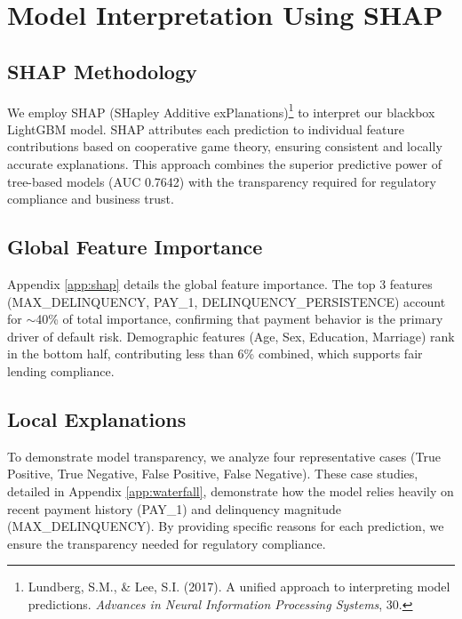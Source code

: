 \documentclass[12pt]{article}
\begin{document}
\section{Model Interpretation Using SHAP}\label{sec:shap}

\subsection{SHAP Methodology}

We employ SHAP (SHapley Additive exPlanations)\footnote{Lundberg, S.M., \& Lee, S.I. (2017). A unified approach to interpreting model predictions. \textit{Advances in Neural Information Processing Systems}, 30.} to interpret our blackbox LightGBM model. SHAP attributes each prediction to individual feature contributions based on cooperative game theory, ensuring consistent and locally accurate explanations. This approach combines the superior predictive power of tree-based models (AUC 0.7642) with the transparency required for regulatory compliance and business trust.

\subsection{Global Feature Importance}

Appendix \ref{app:shap} details the global feature importance. The top 3 features (MAX\_DELINQUENCY, PAY\_1, DELINQUENCY\_PERSISTENCE) account for $\sim$40\% of total importance, confirming that payment behavior is the primary driver of default risk. Demographic features (Age, Sex, Education, Marriage) rank in the bottom half, contributing less than 6\% combined, which supports fair lending compliance.

\subsection{Local Explanations}

To demonstrate model transparency, we analyze four representative cases (True Positive, True Negative, False Positive, False Negative). These case studies, detailed in Appendix \ref{app:waterfall}, demonstrate how the model relies heavily on recent payment history (PAY\_1) and delinquency magnitude (MAX\_DELINQUENCY). By providing specific reasons for each prediction, we ensure the transparency needed for regulatory compliance.
\end{document}
